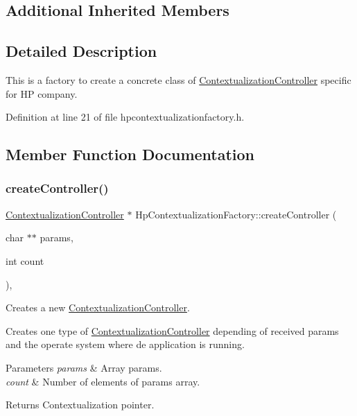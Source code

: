 \subsection*{Additional Inherited Members}


\subsection{Detailed Description}
This is a factory to create a concrete class of \mbox{\hyperlink{classContextualizationController}{Contextualization\+Controller}} specific for HP company. 

Definition at line 21 of file hpcontextualizationfactory.\+h.



\subsection{Member Function Documentation}
\mbox{\label{classHpContextualizationFactory_ad9d9c11a2827c8854c4cadbf38b4e7ca}} 
\subsubsection{\texorpdfstring{create\+Controller()}{createController()}}
{\footnotesize\ttfamily \mbox{\hyperlink{classContextualizationController}{Contextualization\+Controller}} $\ast$ Hp\+Contextualization\+Factory\+::create\+Controller (\begin{DoxyParamCaption}\item[{char $\ast$$\ast$}]{params,  }\item[{int}]{count }\end{DoxyParamCaption})\hspace{0.3cm}{\ttfamily [override]}, {\ttfamily [virtual]}}



Creates a new \mbox{\hyperlink{classContextualizationController}{Contextualization\+Controller}}. 

Creates one type of \mbox{\hyperlink{classContextualizationController}{Contextualization\+Controller}} depending of received params and the operate system where de application is running. 
\begin{DoxyParams}{Parameters}
{\em params} & Array params. \\
\hline
{\em count} & Number of elements of params array. \\
\hline
\end{DoxyParams}
\begin{DoxyReturn}{Returns}
Contextualization pointer. 
\end{DoxyReturn}


